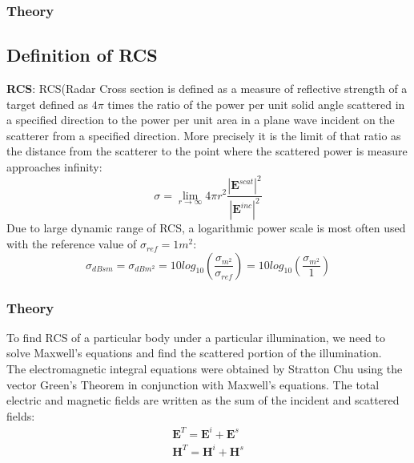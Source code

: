 \documentclass{beamer}
\begin{document}
\begin{frame}
\frametitle{Theory}
\subsection{Definition of RCS}
\textbf{RCS}: RCS(Radar Cross section is defined as a measure of reflective strength of a target defined as $4\pi$ times the ratio of the power per unit solid angle scattered  in a specified direction to the power per unit area in a plane wave incident on the scatterer from a specified direction. More precisely it is the limit of that ratio as the distance from the scatterer to the point where the scattered power is measure approaches infinity:
\begin{equation}
\sigma = \lim_{r\to\infty} 4\pi r^2 \frac{|\textbf{E}^{scat}|^2}{|\textbf{E}^{inc}|^2}
\end{equation}
Due to large dynamic range of RCS, a logarithmic power scale is most often used with the reference value of $\sigma_{ref} = 1 m^2$:
\begin{equation}
\sigma_{dBsm} = \sigma_{dBm^2} = 10log_{10}(\frac{\sigma_{m^2}}{\sigma_{ref}}) = 10log_{10}(\frac{\sigma_{m^2}}{1})
\end{equation}
\end{frame}
\begin{frame}
\frametitle{Theory}
To find RCS of a particular body under a particular illumination, we need to solve Maxwell's equations and find the scattered portion of the illumination.\\
The electromagnetic integral equations were obtained by Stratton Chu using the vector Green's Theorem in conjunction with Maxwell's equations. The total electric and magnetic fields are written as the sum of the incident and scattered fields:
\begin{eqnarray}
\textbf{E}^T = \textbf{E}^i + \textbf{E}^s \\
\textbf{H}^T = \textbf{H}^i + \textbf{H}^s \\
\end{eqnarray}
\end{frame}
\end{document}
